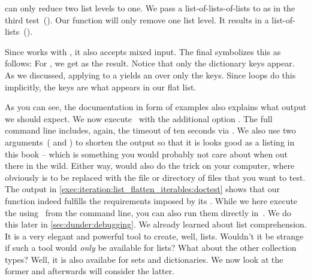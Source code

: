  can only reduce two list levels to one.
We pass a list-of-lists-of-lists to  as in the third test~().
Our function will only remove one list level.
It results in a list-of-lists~(\pythonil{[[1], [2], [3], [4], [5], [6]]}).%
%
\begin{sloppypar}%
Since  works with , it also accepts mixed input.
The final  symbolizes this as follows:
For , we get \pythonil{[1, 2, 3, 4, 5, 6, 'a', 'b']} as the result.
Notice that only the dictionary keys appear.
As we discussed, applying  to a  yields an  over only the keys.
Since  loops do this implicitly, the keys are what appears in our flat list.%
\end{sloppypar}%
%
As you can see, the documentation in form of examples also explains what output we should expect.
We now execute \pytest\ with the additional option .
The full command line includes, again, the timeout of ten seconds via .
We also use two arguments~( and ) to shorten the output so that it is looks good as a listing in this book -- which is something you would probably not care about when out there in the wild.
Either way,  would also do the trick on your computer, where  obviously is to be replaced with the file or directory of files that you want to test.
The output in \cref{exec:iteration:list_flatten_iterables:doctest} shows that our function indeed fulfills the requirements imposed by its .%
%
%
%
While we here execute the  using \pytest\ from the command line, you can also run them directly in~\pycharm.
We do this later in \cref{sec:dunder:debugging}.%
%
\FloatBarrier%
\endhsection%
%
%
%
We already learned about list comprehension.
It is a very elegant and powerful tool to create, well, lists.
Wouldn't it be strange if such a tool would \emph{only} be available for lists?
What about the other collection types?
Well, it is also availabe for sets and dictionaries.
We now look at the former and afterwards will consider the latter.

